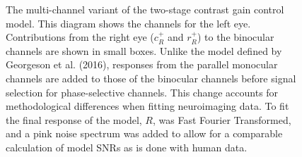 \documentclass[
  12pt,
]{article}
\begin{document}
\begin{figure}


\caption{\label{fig-modelDiagram}The multi-channel variant of the
two-stage contrast gain control model. This diagram shows the channels
for the left eye. Contributions from the right eye (\(c^+_R\) and
\(r^+_R\)) to the binocular channels are shown in small boxes. Unlike
the model defined by Georgeson et al. (2016), responses from the
parallel monocular channels are added to those of the binocular channels
before signal selection for phase-selective channels. This change
accounts for methodological differences when fitting neuroimaging data.
To fit the final response of the model, \(R\), was Fast Fourier
Transformed, and a pink noise spectrum was added to allow for a
comparable calculation of model SNRs as is done with human data.}

\end{figure}%
\end{document}
